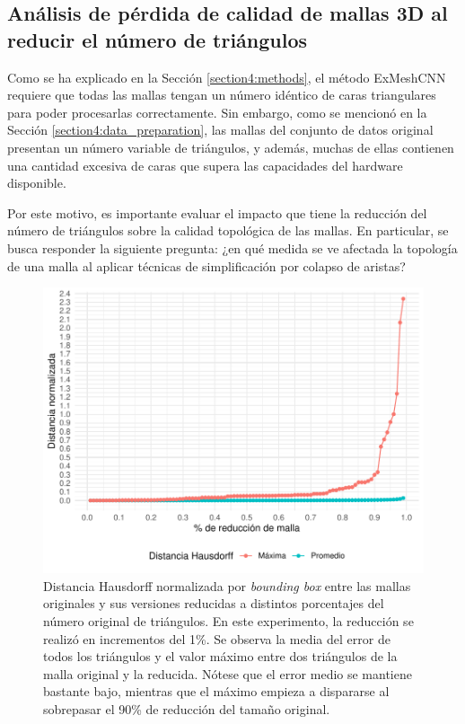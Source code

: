 \subsection{Análisis de pérdida de calidad de mallas 3D al reducir el número de triángulos}
\label{section5:experiment_edge_collapse}
Como se ha explicado en la Sección \ref{section4:methods}, el método ExMeshCNN requiere que todas las mallas tengan un número idéntico de caras triangulares para poder procesarlas correctamente. Sin embargo, como se mencionó en la Sección \ref{section4:data_preparation}, las mallas del conjunto de datos original presentan un número variable de triángulos, y además, muchas de ellas contienen una cantidad excesiva de caras que supera las capacidades del hardware disponible.

Por este motivo, es importante evaluar el impacto que tiene la reducción del número de triángulos sobre la calidad topológica de las mallas. En particular, se busca responder la siguiente pregunta: ¿en qué medida se ve afectada la topología de una malla al aplicar técnicas de simplificación por colapso de aristas?

\begin{figure}[h]
    \centering
    \includegraphics[width=\linewidth]{figures/5_experiments/mesh_redux_study.pdf}
    \caption[Estudio de reducción de mallas]{Distancia Hausdorff normalizada por \textit{bounding box} entre las mallas originales y sus versiones reducidas a distintos porcentajes del número original de triángulos. En este experimento, la reducción se realizó en incrementos del 1\%. Se observa la media del error de todos los triángulos y el valor máximo entre dos triángulos de la malla original y la reducida. Nótese que el error medio se mantiene bastante bajo, mientras que el máximo empieza a dispararse al sobrepasar el 90\% de reducción del tamaño original.}
    \label{fig5:redux_study}
\end{figure}

